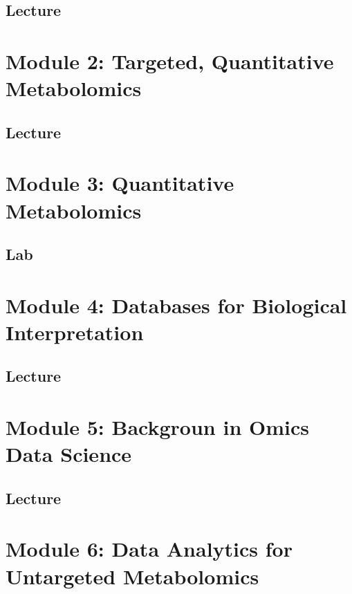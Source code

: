 \documentclass[
]{book}
\begin{document}
\section{Lecture}\label{lecture}

\chapter{Module 2: Targeted, Quantitative Metabolomics}\label{module-2-targeted-quantitative-metabolomics}

\section{Lecture}\label{lecture-1}

\chapter{Module 3: Quantitative Metabolomics}\label{module-3-quantitative-metabolomics}

\section{Lab}\label{lab}

\chapter{Module 4: Databases for Biological Interpretation}\label{module-4-databases-for-biological-interpretation}

\section{Lecture}\label{lecture-2}

\chapter{Module 5: Backgroun in Omics Data Science}\label{module-5-backgroun-in-omics-data-science}

\section{Lecture}\label{lecture-3}

\chapter{Module 6: Data Analytics for Untargeted Metabolomics}\label{module-6-data-analytics-for-untargeted-metabolomics}
\end{document}
